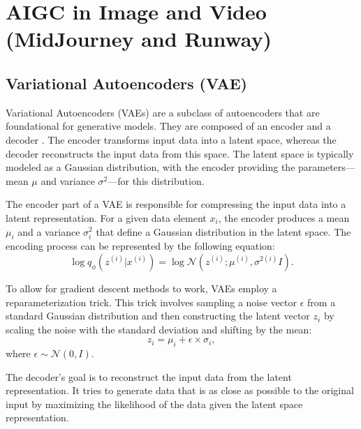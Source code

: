 \documentclass[11pt,a4paper,oneside]{report}
\begin{document}
\section{AIGC in Image and Video (MidJourney and Runway)}

\subsection{Variational Autoencoders (VAE)}

Variational Autoencoders (VAEs) are a subclass of autoencoders that are foundational for generative models. They are composed of an encoder and a decoder \cite{cho2014properties}. The encoder transforms input data into a latent space, whereas the decoder reconstructs the input data from this space. The latent space is typically modeled as a Gaussian distribution, with the encoder providing the parameters—mean $\mu$ and variance $\sigma^2$—for this distribution.

The encoder part of a VAE is responsible for compressing the input data into a latent representation. For a given data element $x_i$, the encoder produces a mean $\mu_i$ and a variance $\sigma^2_i$ that define a Gaussian distribution in the latent space. The encoding process can be represented by the following equation:
\begin{equation}
\log q_{\phi} \left( z^{(i)} | x^{(i)} \right) = \log \mathcal{N} \left( z^{(i)}; \mu^{(i)}, \sigma^{2(i)} I \right).
\end{equation}

To allow for gradient descent methods to work, VAEs employ a reparameterization trick. This trick involves sampling a noise vector $\epsilon$ from a standard Gaussian distribution and then constructing the latent vector $z_i$ by scaling the noise with the standard deviation and shifting by the mean:
\begin{equation}
z_i = \mu_i + \epsilon \times \sigma_i,
\end{equation}
where $\epsilon \sim \mathcal{N}(0, I)$.

The decoder's goal is to reconstruct the input data from the latent representation. It tries to generate data that is as close as possible to the original input by maximizing the likelihood of the data given the latent space representation.
\end{document}
